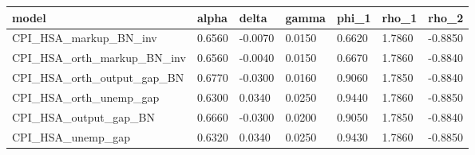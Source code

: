 \begin{tabular}{lllllll}
\toprule
model & alpha & delta & gamma & phi_1 & rho_1 & rho_2 \\
\midrule
CPI_HSA_markup_BN_inv & 0.6560 & -0.0070 & 0.0150 & 0.6620 & 1.7860 & -0.8850 \\
CPI_HSA_orth_markup_BN_inv & 0.6560 & -0.0040 & 0.0150 & 0.6670 & 1.7860 & -0.8840 \\
CPI_HSA_orth_output_gap_BN & 0.6770 & -0.0300 & 0.0160 & 0.9060 & 1.7850 & -0.8840 \\
CPI_HSA_orth_unemp_gap & 0.6300 & 0.0340 & 0.0250 & 0.9440 & 1.7860 & -0.8850 \\
CPI_HSA_output_gap_BN & 0.6660 & -0.0300 & 0.0200 & 0.9050 & 1.7850 & -0.8840 \\
CPI_HSA_unemp_gap & 0.6320 & 0.0340 & 0.0250 & 0.9430 & 1.7860 & -0.8850 \\
\bottomrule
\end{tabular}
